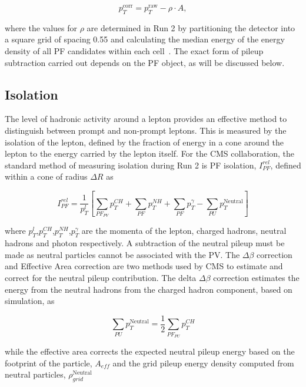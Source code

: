 \begin{equation}
p_T^{\text{corr}} = p_T^{\text{raw}} - \rho \cdot A,
\end{equation}

where the values for $\rho$ are determined in Run 2 by partitioning the detector into a square grid of spacing
0.55 and calculating the median energy of the energy density of all PF candidates within each cell~\cite{fastjet}.
The exact form of pileup subtraction carried out depends on the PF object, as
will be discussed below.

\subsection{Isolation}

The level of hadronic activity around a lepton provides an effective method to distinguish between prompt and non-prompt leptons.
This is measured by the isolation of the lepton, defined by the fraction of energy
in a cone around the lepton to the energy carried by the lepton itself. For the
CMS collaboration, the standard method of measuring isolation during Run 2 
is PF isolation, $I_{PF}^{rel}$, defined within a cone of radius $\Delta R$ as 

\begin{equation}
I_{PF}^{rel} = \frac{1}{p_T^{l}}\left[ \sum_{PF_{PV}}p_T^{CH} +  \sum_{PF}p_T^{NH} +  \sum_{PF}p_T^{\gamma} -  \sum_{PU}p_T^{\text{Neutral}}\right]
\end{equation}

where $p_T^{l}$,$p_T^{CH}$,$p_T^{NH}$,$p_T^{\gamma}$ are the momenta of the lepton, charged hadrons, neutral hadrons and photon respectively.
A subtraction of the neutral pileup must be made as neutral particles cannot be associated with the PV. The $\Delta \beta$ correction
and Effective Area correction are two methods used by CMS to estimate and correct for the neutral pileup contribution. The delta $\Delta \beta$
correction estimates the energy from the neutral hadrons from the charged hadron component, based on simulation, as

\begin{equation}
\sum_{PU}p_T^{\text{Neutral}} = \frac{1}{2} \sum_{PF_{PU}}p_T^{CH}
\end{equation}

while the effective area corrects the expected neutral pileup energy based on the footprint of the particle, $A_{eff}$ and the grid pileup
energy density computed from neutral particles, $\rho_{grid}^{\text{Neutral}}$

